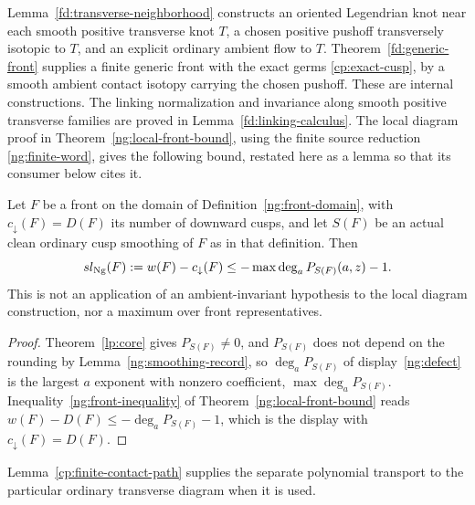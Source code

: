Lemma~\ref{fd:transverse-neighborhood} constructs an oriented Legendrian
knot near each smooth positive transverse knot $T$, a chosen positive
pushoff transversely isotopic to $T$, and an explicit ordinary ambient
flow to $T$. Theorem~\ref{fd:generic-front} supplies a finite generic
front with the exact germs \eqref{cp:exact-cusp}, by a smooth ambient
contact isotopy carrying the chosen pushoff. These are internal
constructions. The linking normalization and invariance along smooth
positive transverse families are proved in Lemma~\ref{fd:linking-calculus}.
The local diagram proof in Theorem~\ref{ng:local-front-bound}, using
the finite source reduction \ref{ng:finite-word}, gives the following
bound, restated here as a lemma so that its consumer below cites it.

\begin{lemma}\label{fd:ng-bound}
Let $F$ be a front on the domain of Definition~\ref{ng:front-domain}, with
$c_\downarrow(F)=D(F)$ its number of downward cusps, and let $S(F)$ be an
actual clean ordinary cusp smoothing of $F$ as in that definition. Then
\begin{equation}\label{fd:ng-input}
 sl_{\rm Ng}(F):=w(F)-c_\downarrow(F)
          \leq-\max\deg_a P_{S(F)}(a,z)-1.
\end{equation}
This is not an application of an ambient-invariant hypothesis to the
local diagram construction, nor a maximum over front representatives.
\end{lemma}
\begin{proof}
Theorem~\ref{lp:core} gives $P_{S(F)}\neq0$, and $P_{S(F)}$ does not depend
on the rounding by Lemma~\ref{ng:smoothing-record}, so $\deg_a P_{S(F)}$ of
display~\eqref{ng:defect} is the largest $a$ exponent with nonzero
coefficient, $\max\deg_a P_{S(F)}$. Inequality~\eqref{ng:front-inequality}
of Theorem~\ref{ng:local-front-bound} reads
$w(F)-D(F)\leq-\deg_aP_{S(F)}-1$, which is the display with
$c_\downarrow(F)=D(F)$.
\end{proof}

Lemma~\ref{cp:finite-contact-path} supplies the separate polynomial
transport to the particular ordinary transverse diagram when it is used.

